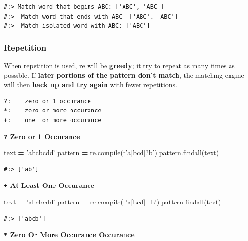\documentclass[
]{book}
\newenvironment{Shaded}{\begin{snugshade}}{\end{snugshade}}
\newcommand{\BuiltInTok}[1]{#1}
\newcommand{\NormalTok}[1]{#1}
\newcommand{\OperatorTok}[1]{\textcolor[rgb]{0.43,0.43,0.43}{\textbf{#1}}}
\newcommand{\StringTok}[1]{\textcolor[rgb]{0.5,0.5,0.5}{#1}}
\newcommand{\VerbatimStringTok}[1]{\textcolor[rgb]{0.5,0.5,0.5}{#1}}
\begin{document}
\begin{verbatim}
#:> Match word that begins ABC: ['ABC', 'ABC'] 
#:>  Match word that ends with ABC: ['ABC', 'ABC'] 
#:>  Match isolated word with ABC: ['ABC']
\end{verbatim}

\hypertarget{repetition}{%
\subsubsection{Repetition}\label{repetition}}

When repetition is used, re will be \textbf{greedy}; it try to repeat as many times as possible. If \textbf{later portions of the pattern don't match}, the matching engine will then \textbf{back up and try again} with fewer repetitions.

\begin{verbatim}
?:    zero or 1 occurance
*:    zero or more occurance
+:    one  or more occurance
\end{verbatim}

\textbf{\texttt{?} Zero or 1 Occurance}

\begin{Shaded}
\begin{Highlighting}[]
\NormalTok{text }\OperatorTok{=} \StringTok{'abcbcdd'}
\NormalTok{pattern }\OperatorTok{=}\NormalTok{ re.}\BuiltInTok{compile}\NormalTok{(}\VerbatimStringTok{r'a[bcd]?b'}\NormalTok{)}
\NormalTok{pattern.findall(text)}
\end{Highlighting}
\end{Shaded}

\begin{verbatim}
#:> ['ab']
\end{verbatim}

\textbf{\texttt{+} At Least One Occurance}

\begin{Shaded}
\begin{Highlighting}[]
\NormalTok{text }\OperatorTok{=} \StringTok{'abcbcdd'}
\NormalTok{pattern }\OperatorTok{=}\NormalTok{ re.}\BuiltInTok{compile}\NormalTok{(}\VerbatimStringTok{r'a[bcd]+b'}\NormalTok{)}
\NormalTok{pattern.findall(text)}
\end{Highlighting}
\end{Shaded}

\begin{verbatim}
#:> ['abcb']
\end{verbatim}

\textbf{\texttt{*} Zero Or More Occurance Occurance}
\end{document}
